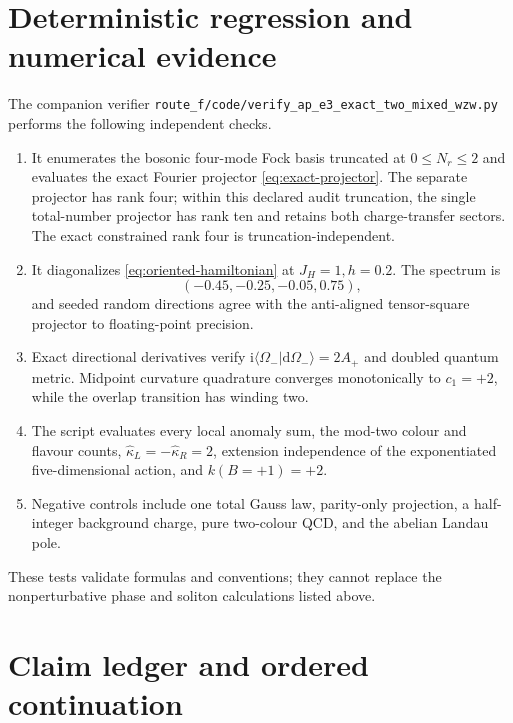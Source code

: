 \documentclass[11pt]{article}
\theoremstyle{definition}
\theoremstyle{remark}
\newcommand{\ii}{\mathrm i}
\newcommand{\dd}{\mathrm d}
\newcommand{\braket}[2]{\langle #1\vert #2\rangle}
\begin{document}
\section{Deterministic regression and numerical evidence}

The companion verifier
\texttt{route\_f/code/verify\_ap\_e3\_exact\_two\_mixed\_wzw.py}
performs the following independent checks.
\begin{enumerate}
\item It enumerates the bosonic four-mode Fock basis truncated at
  \(0\le N_r\le2\) and evaluates the exact Fourier projector
  \eqref{eq:exact-projector}.  The separate projector has rank four; within
  this declared audit truncation, the single total-number projector has rank
  ten and retains both charge-transfer sectors.  The exact constrained rank
  four is truncation-independent.
\item It diagonalizes \eqref{eq:oriented-hamiltonian} at \(J_H=1,h=0.2\).
  The spectrum is
  \begin{equation}
  (-0.45,-0.25,-0.05,0.75),
  \label{eq:numerical-spectrum}
  \end{equation}
  and seeded random directions agree with the anti-aligned tensor-square
  projector to floating-point precision.
\item Exact directional derivatives verify
  \(\ii\braket{\Omega_-}{\dd\Omega_-}=2A_+\) and doubled quantum metric.
  Midpoint curvature quadrature converges monotonically to \(c_1=+2\), while
  the overlap transition has winding two.
\item The script evaluates every local anomaly sum, the mod-two colour and
  flavour counts, \(\widehat\kappa_L=-\widehat\kappa_R=2\), extension
  independence of the exponentiated five-dimensional action, and
  \(k(B=+1)=+2\).
\item Negative controls include one total Gauss law, parity-only projection,
  a half-integer background charge, pure two-colour QCD, and the abelian
  Landau pole.
\end{enumerate}
These tests validate formulas and conventions; they cannot replace the
nonperturbative phase and soliton calculations listed above.

\section{Claim ledger and ordered continuation}
\end{document}

